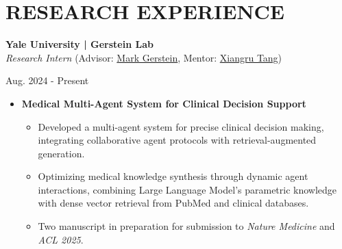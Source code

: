 \documentclass[10pt, letterpaper]{article}
\newenvironment{highlights}{
    \begin{itemize}[
        topsep=0.10 cm,
        parsep=0.10 cm,
        partopsep=0pt,
        itemsep=0pt,
        leftmargin=0 cm + 10pt
    ]
}{
    \end{itemize}
} %
\newenvironment{twocolentry}[2][]{
    \onecolentry
    \def\secondColumn{#2}
    \setcolumnwidth{\fill, 3.5 cm}
    \begin{paracol}{2}
}{
    \switchcolumn \raggedleft \secondColumn
    \end{paracol}
    \endonecolentry
} %
\begin{document}
\section{RESEARCH EXPERIENCE}
\vspace{0.2 cm}
        \begin{twocolentry}{
            Aug. 2024 - Present\\ 
        }
        \textbf{Yale University | Gerstein Lab} \href{https://www.gersteinlab.org/}{\faExternalLink*}\\
        \textit{Research Intern} (Advisor: \href{https://scholar.google.com/citations?user=YvjuUugAAAAJ&hl=en}{Mark Gerstein}, Mentor: \href{https://scholar.google.com.hk/citations?user=gGcRkpYAAAAJ&hl=en}{Xiangru Tang})
        
        \end{twocolentry}
    \vspace{0.2 cm}
\begin{highlights}
    \item \textbf{Medical Multi-Agent System for Clinical Decision Support}
        \vspace{-0.1 cm}
    \begin{highlights}
        \item Developed a multi-agent system for precise clinical decision making, integrating collaborative agent protocols with retrieval-augmented generation.
        \item Optimizing medical knowledge synthesis through dynamic agent interactions, combining Large Language Model's parametric knowledge with dense vector retrieval from PubMed and clinical databases.
        \item Two manuscript in preparation for submission to \textit{Nature Medicine} and \textit{ACL 2025}.

    \end{highlights}

%
\end{highlights}
\end{document}
